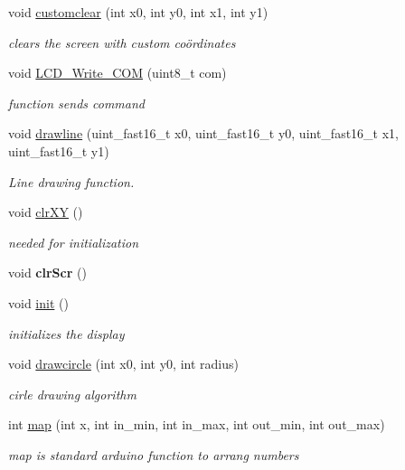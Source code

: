 \begin{DoxyCompactItemize}
void \hyperlink{classdisplay_a65036271ee5031dcc04a9e53e013e5d4}{customclear} (int x0, int y0, int x1, int y1)
\begin{DoxyCompactList}\small\item\em clears the screen with custom coördinates \end{DoxyCompactList}\item 
void \hyperlink{classdisplay_a1975e05bb65cbfcf209ace9dbea7d660}{L\+C\+D\+\_\+\+Write\+\_\+\+C\+OM} (uint8\+\_\+t com)
\begin{DoxyCompactList}\small\item\em function sends command \end{DoxyCompactList}\item 
void \hyperlink{classdisplay_a60e7eb3a85be87ac2867608fd35c9a02}{drawline} (uint\+\_\+fast16\+\_\+t x0, uint\+\_\+fast16\+\_\+t y0, uint\+\_\+fast16\+\_\+t x1, uint\+\_\+fast16\+\_\+t y1)
\begin{DoxyCompactList}\small\item\em Line drawing function. \end{DoxyCompactList}\item 
void \hyperlink{classdisplay_ad4f6e4f332f7d296d0917cfeff271507}{clr\+XY} ()
\begin{DoxyCompactList}\small\item\em needed for initialization \end{DoxyCompactList}\item 
\mbox{\label{classdisplay_a6798596733a6427286ed80a651ad7bf3}} 
void {\bfseries clr\+Scr} ()
\item 
void \hyperlink{classdisplay_aa0b94eb3cb43b47dc720542cf7d1da9b}{init} ()
\begin{DoxyCompactList}\small\item\em initializes the display \end{DoxyCompactList}\item 
void \hyperlink{classdisplay_aea3fc9645f5b6a097cafd2524b4dd0ee}{drawcircle} (int x0, int y0, int radius)
\begin{DoxyCompactList}\small\item\em cirle drawing algorithm \end{DoxyCompactList}\item 
int \hyperlink{classdisplay_aa25dc0f889ff19b65c51fe6b94872398}{map} (int x, int in\+\_\+min, int in\+\_\+max, int out\+\_\+min, int out\+\_\+max)
\begin{DoxyCompactList}\small\item\em map is standard arduino function to arrang numbers \end{DoxyCompactList}\item 

\end{DoxyCompactItemize}
